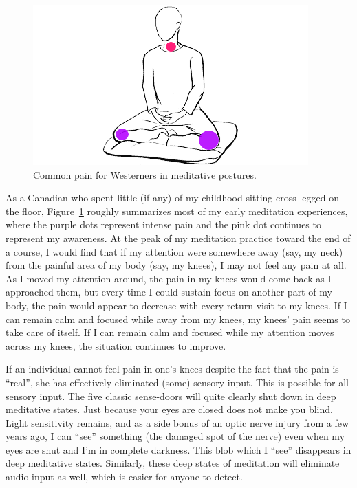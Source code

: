 \documentclass{article}
\begin{document}
\begin{figure}[h]
  \centering
  \includegraphics[width=\linewidth]{images/burmese-vipassana-pain.png}
  \caption{Common pain for Westerners in meditative postures.}
  \label{fig:burmese-vipassana-pain}
\end{figure}

As a Canadian who spent little (if any) of my childhood sitting cross-legged on the floor, Figure~\ref{fig:burmese-vipassana-pain} roughly summarizes most of my early meditation experiences, where the purple dots represent intense pain and the pink dot continues to represent my awareness. At the peak of my meditation practice toward the end of a course, I would find that if my attention were somewhere away (say, my neck) from the painful area of my body (say, my knees), I may not feel any pain at all. As I moved my attention around, the pain in my knees would come back as I approached them, but every time I could sustain focus on another part of my body, the pain would appear to decrease with every return visit to my knees. If I can remain calm and focused while away from my knees, my knees' pain seems to take care of itself. If I can remain calm and focused while my attention moves across my knees, the situation continues to improve.

If an individual cannot feel pain in one's knees despite the fact that the pain is ``real'', she has effectively eliminated (some) sensory input. This is possible for all sensory input. The five classic sense-doors will quite clearly shut down in deep meditative states. Just because your eyes are closed does not make you blind. Light sensitivity remains, and as a side bonus of an optic nerve injury from a few years ago, I can ``see'' something (the damaged spot of the nerve) even when my eyes are shut and I'm in complete darkness. This blob which I ``see'' disappears in deep meditative states. Similarly, these deep states of meditation will eliminate audio input as well, which is easier for anyone to detect.
\end{document}
